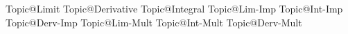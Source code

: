 Topic@Limit	         		 %
Topic@Derivative            %
Topic@Integral 				 %
Topic@Lim-Imp				 %
Topic@Int-Imp				 %
Topic@Derv-Imp				 %
Topic@Lim-Mult				 %
Topic@Int-Mult				 %
Topic@Derv-Mult				 %



